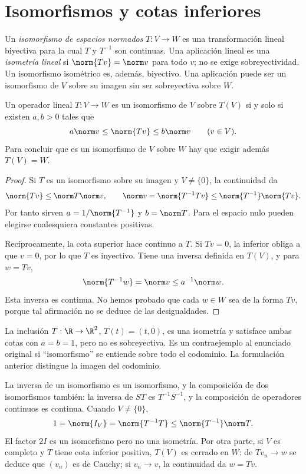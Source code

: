 \section{Isomorfismos y cotas inferiores}

\begin{definicion}
Un \emph{isomorfismo de espacios normados} $T:V\to W$ es una transformación lineal biyectiva para la cual $T$ y $T^{-1}$ son continuas. Una aplicación lineal es una \emph{isometría lineal} si $\norm{Tv}=\norm v$ para todo $v$; no se exige sobreyectividad. Un isomorfismo isométrico es, además, biyectivo. Una aplicación puede ser un isomorfismo de $V$ sobre su imagen sin ser sobreyectiva sobre $W$.
\end{definicion}

\begin{teorema}\label{ch21:cota-inferior}
Un operador lineal $T:V\to W$ es un isomorfismo de $V$ sobre $T(V)$ si y solo si existen $a,b>0$ tales que
\[
 a\norm v\leq\norm{Tv}\leq b\norm v\qquad(v\in V).
\]
Para concluir que es un isomorfismo de $V$ sobre $W$ hay que exigir además $T(V)=W$.
\end{teorema}
\begin{proof}
Si $T$ es un isomorfismo sobre su imagen y $V\ne\{0\}$, la continuidad da
\[
 \norm{Tv}\leq\norm T\norm v,
 \qquad\norm v=\norm{T^{-1}Tv}\leq\norm{T^{-1}}\norm{Tv}.
\]
Por tanto sirven $a=1/\norm{T^{-1}}$ y $b=\norm T$. Para el espacio nulo pueden elegirse cualesquiera constantes positivas.

Recíprocamente, la cota superior hace continuo a $T$. Si $Tv=0$, la inferior obliga a que $v=0$, por lo que $T$ es inyectivo. Tiene una inversa definida en $T(V)$, y para $w=Tv$,
\[
 \norm{T^{-1}w}=\norm v\leq a^{-1}\norm w.
\]
Esta inversa es continua. No hemos probado que cada $w\in W$ sea de la forma $Tv$, porque tal afirmación no se deduce de las desigualdades.
\end{proof}

\begin{observacion}
La inclusión $T:\R\to\R^2$, $T(t)=(t,0)$, es una isometría y satisface ambas cotas con $a=b=1$, pero no es sobreyectiva. Es un contraejemplo al enunciado original si ``isomorfismo'' se entiende sobre todo el codominio. La formulación anterior distingue la imagen del codominio.
\end{observacion}

La inversa de un isomorfismo es un isomorfismo, y la composición de dos isomorfismos también: la inversa de $ST$ es $T^{-1}S^{-1}$, y la composición de operadores continuos es continua. Cuando $V\ne\{0\}$,
\[
 1=\norm{I_V}=\norm{T^{-1}T}\leq\norm{T^{-1}}\norm T.
\]
El factor $2I$ es un isomorfismo pero no una isometría. Por otra parte, si $V$ es completo y $T$ tiene cota inferior positiva, $T(V)$ es cerrado en $W$: de $Tv_n\to w$ se deduce que $(v_n)$ es de Cauchy; si $v_n\to v$, la continuidad da $w=Tv$.

